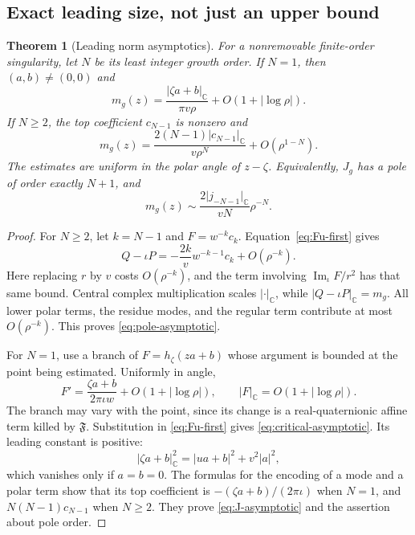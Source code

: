 \documentclass[11pt,a4paper]{article}
\numberwithin{equation}{section}
\newtheorem{theorem}{Theorem}[section]
\theoremstyle{definition}
\theoremstyle{remark}
\newcommand{\C}{\mathbb C}
\newcommand{\Fu}{\mathfrak F}
\newcommand{\ImC}{\operatorname{Im}_{\iota}}
\newcommand{\cnorm}[1]{\lvert #1\rvert_{\C}}
\begin{document}
\subsection{Exact leading size, not just an upper bound}
\begin{theorem}[Leading norm asymptotics]\label{thm:asymptotic}
For a nonremovable finite-order singularity, let $N$ be its least
integer growth order. If $N=1$, then $(a,b)\ne(0,0)$ and
\begin{equation}\label{eq:critical-asymptotic}
 m_g(z)=\frac{\cnorm{\zeta a+b}}{\pi v\rho}
             +O(1+|\log\rho|).
\end{equation}
If $N\ge2$, the top coefficient $c_{N-1}$ is nonzero and
\begin{equation}\label{eq:pole-asymptotic}
 m_g(z)=\frac{2(N-1)\cnorm{c_{N-1}}}{v\rho^N}
             +O(\rho^{1-N}).
\end{equation}
The estimates are uniform in the polar angle of $z-\zeta$.
Equivalently, $J_g$ has a pole of order exactly $N+1$, and
\begin{equation}\label{eq:J-asymptotic}
 m_g(z)\sim \frac{2\cnorm{j_{-N-1}}}{vN}\rho^{-N}.
\end{equation}
\end{theorem}
\begin{proof}
For $N\ge2$, let $k=N-1$ and $F=w^{-k}c_k$.
Equation~\eqref{eq:Fu-first} gives
\[
 Q-\iota P=-\frac{2k}{v}w^{-k-1}c_k+O(\rho^{-k}).
\]
Here replacing $r$ by $v$ costs $O(\rho^{-k})$, and the term involving
$\ImC F/r^2$ has that same bound. Central complex multiplication scales
$\cnorm{\cdot}$, while $\cnorm{Q-\iota P}=m_g$. All lower polar terms,
the residue modes, and the regular term contribute at most
$O(\rho^{-k})$. This proves \eqref{eq:pole-asymptotic}.

For $N=1$, use a branch of $F=h_\zeta(za+b)$ whose argument is bounded
at the point being estimated. Uniformly in angle,
\[
 F'=\frac{\zeta a+b}{2\pi\iota w}+O(1+|\log\rho|),
 \qquad \cnorm F=O(1+|\log\rho|).
\]
The branch may vary with the point, since its change is a real-quaternionic
affine term killed by $\Fu$. Substitution in \eqref{eq:Fu-first} gives
\eqref{eq:critical-asymptotic}. Its leading constant is positive:
\[
 \cnorm{\zeta a+b}^2=|ua+b|^2+v^2|a|^2,
\]
which vanishes only if $a=b=0$.
The formulas for the encoding of a mode and a polar term show that its
top coefficient is $-(\zeta a+b)/(2\pi\iota)$ when $N=1$, and
$N(N-1)c_{N-1}$ when $N\ge2$. They prove
\eqref{eq:J-asymptotic} and the assertion about pole order.
\end{proof}
\end{document}

